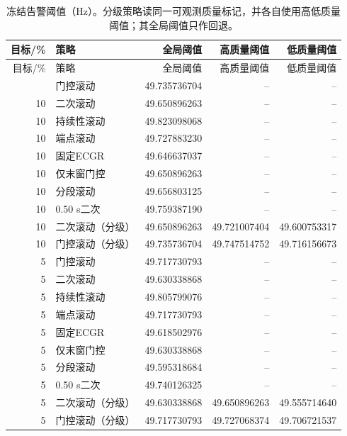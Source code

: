 \documentclass[UTF8,a4paper,11pt]{ctexart}
\begin{document}
\begingroup\scriptsize\setlength{\tabcolsep}{3pt}
\begin{longtable}{rlrrr}
\caption{冻结告警阈值（Hz）。分级策略读同一可观测质量标记，并各自使用高低质量阈值；其全局阈值只作回退。}\label{tab:transfer-cutoffs}\\
\toprule
目标/\% & 策略 & 全局阈值 & 高质量阈值 & 低质量阈值 \\
\midrule\endfirsthead
\toprule
目标/\% & 策略 & 全局阈值 & 高质量阈值 & 低质量阈值 \\
\midrule\endhead
\bottomrule\endfoot
10 & 门控滚动 & 49.735736704 & -- & -- \\
10 & 二次滚动 & 49.650896263 & -- & -- \\
10 & 持续性滚动 & 49.823098068 & -- & -- \\
10 & 端点滚动 & 49.727883230 & -- & -- \\
10 & 固定ECGR & 49.646637037 & -- & -- \\
10 & 仅末窗门控 & 49.650896263 & -- & -- \\
10 & 分段滚动 & 49.656803125 & -- & -- \\
10 & 0.50 s二次 & 49.759387190 & -- & -- \\
10 & 二次滚动（分级） & 49.650896263 & 49.721007404 & 49.600753317 \\
10 & 门控滚动（分级） & 49.735736704 & 49.747514752 & 49.716156673 \\
5 & 门控滚动 & 49.717730793 & -- & -- \\
5 & 二次滚动 & 49.630338868 & -- & -- \\
5 & 持续性滚动 & 49.805799076 & -- & -- \\
5 & 端点滚动 & 49.717730793 & -- & -- \\
5 & 固定ECGR & 49.618502976 & -- & -- \\
5 & 仅末窗门控 & 49.630338868 & -- & -- \\
5 & 分段滚动 & 49.595318684 & -- & -- \\
5 & 0.50 s二次 & 49.740126325 & -- & -- \\
5 & 二次滚动（分级） & 49.630338868 & 49.650896263 & 49.555714640 \\
5 & 门控滚动（分级） & 49.717730793 & 49.727068374 & 49.706721537 \\
\end{longtable}\endgroup

\clearpage
\end{document}
